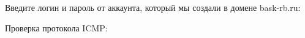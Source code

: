\documentclass[a4paper, 12pt]{report}
\begin{document}
	\clearpage
	
	Введите логин и пароль от аккаунта, который мы создали в домене bask-rb.ru:

	\begin{figure}[h]
		\label{fig:image}
	\end{figure}

	Проверка протокола ICMP:
	
	\begin{figure}[h]
		\label{fig:image}
	\end{figure}
\end{document}
